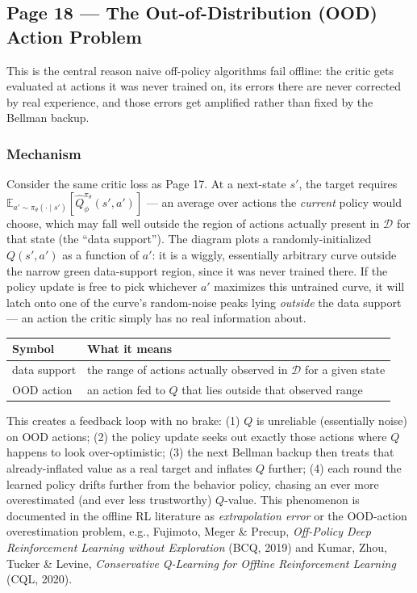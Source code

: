\subsection*{Page 18 --- The Out-of-Distribution (OOD) Action Problem}

This is the central reason naive off-policy algorithms fail offline: the critic gets evaluated at actions it was never trained on, its errors there are never corrected by real experience, and those errors get amplified rather than fixed by the Bellman backup.

\subsubsection*{Mechanism}

Consider the same critic loss as Page 17. At a next-state $s'$, the target requires $\mathbb{E}_{a'\sim\pi_\theta(\cdot\mid s')}[\hat Q_\phi^{\pi_\theta}(s',a')]$ --- an average over actions the \emph{current} policy would choose, which may fall well outside the region of actions actually present in $\mathcal{D}$ for that state (the ``data support''). The diagram plots a randomly-initialized $Q(s',a')$ as a function of $a'$: it is a wiggly, essentially arbitrary curve outside the narrow green data-support region, since it was never trained there. If the policy update is free to pick whichever $a'$ maximizes this untrained curve, it will latch onto one of the curve's random-noise peaks lying \emph{outside} the data support --- an action the critic simply has no real information about.

\begin{center}
\begin{tabular}{@{}ll@{}}
\toprule
Symbol & What it means \\
\midrule
data support & the range of actions actually observed in $\mathcal{D}$ for a given state \\
OOD action & an action fed to $Q$ that lies outside that observed range \\
\bottomrule
\end{tabular}
\end{center}

This creates a feedback loop with no brake: (1) $Q$ is unreliable (essentially noise) on OOD actions; (2) the policy update seeks out exactly those actions where $Q$ happens to look over-optimistic; (3) the next Bellman backup then treats that already-inflated value as a real target and inflates $Q$ further; (4) each round the learned policy drifts further from the behavior policy, chasing an ever more overestimated (and ever less trustworthy) $Q$-value. This phenomenon is documented in the offline RL literature as \emph{extrapolation error} or the OOD-action overestimation problem, e.g., Fujimoto, Meger \& Precup, \emph{Off-Policy Deep Reinforcement Learning without Exploration} (BCQ, 2019) and Kumar, Zhou, Tucker \& Levine, \emph{Conservative Q-Learning for Offline Reinforcement Learning} (CQL, 2020).

